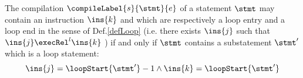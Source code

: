 \begin{compProp}\label{compile:prop:compProp4}  %

The compilation  $\compileLabel{s}{\stmt}{e}$ of a statement $\stmt$ may contain an instruction $\ins{k}$ and   which are respectively 
a loop entry and a loop end  in the sense of Def.\ref{defLoop} (i.e. there exists $\ins{j}$ such that $\ins{j} \execRel^{l} \ins{k}$ ) if and only if  $\stmt$  contains 
 a substatement $\stmt'$ which is a loop statement:
 $$ \ins{j} = \loopStart{\stmt'}  - 1 \wedge  \ins{k} = \loopStart{\stmt'}  $$


	   
              
             

\end{compProp}
 






